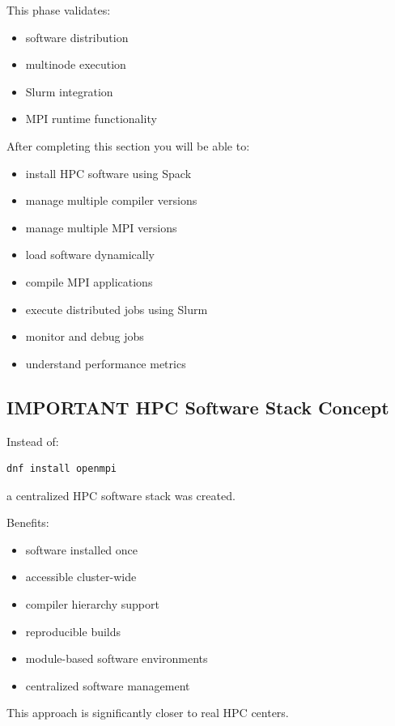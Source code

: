 \documentclass[11pt]{article}
\begin{document}
This phase validates:

\begin{itemize}
\item software distribution
\item multinode execution
\item Slurm integration
\item MPI runtime functionality
\end{itemize}

After completing this section you will be able to:

\begin{itemize}
\item install HPC software using Spack
\item manage multiple compiler versions
\item manage multiple MPI versions
\item load software dynamically
\item compile MPI applications
\item execute distributed jobs using Slurm
\item monitor and debug jobs
\item understand performance metrics
\end{itemize}
\subsection{IMPORTANT HPC Software Stack Concept}
\label{sec:org84e5280}

Instead of:

\begin{verbatim}
dnf install openmpi
\end{verbatim}

a centralized HPC software stack was created.

Benefits:

\begin{itemize}
\item software installed once
\item accessible cluster-wide
\item compiler hierarchy support
\item reproducible builds
\item module-based software environments
\item centralized software management
\end{itemize}

This approach is significantly closer to real HPC centers.
\end{document}
